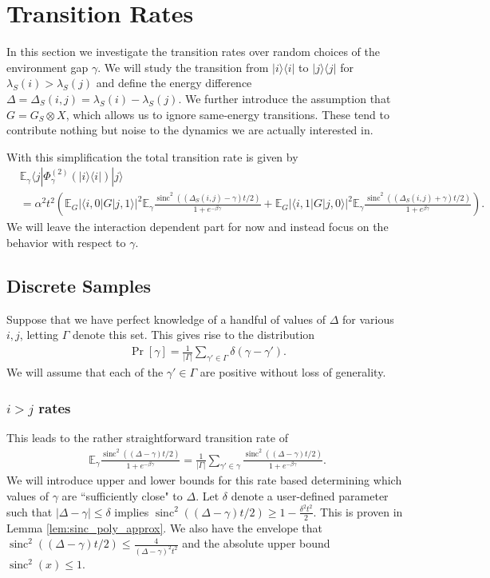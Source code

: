 \documentclass[
 amsmath,amssymb,
 aps,
onecolumn, 
nofootinbib]{revtex4-2}
\newcommand{\ket}[1]{|#1\rangle}
\newcommand{\bra}[1]{\langle #1|}
\newcommand{\ketbra}[2]{| #1\rangle\! \langle #2|}
\newcommand{\abs}[1]{\left| #1 \right|}
\newcommand{\EE}{\mathbb{E}}
\newcommand{\tp}{\otimes}
\DeclareMathOperator{\sinc}{sinc}
\begin{document}
\section{Transition Rates}
In this section we investigate the transition rates over random choices of the environment gap $\gamma$. We will study the transition from $\ketbra{i}{i}$ to $\ketbra{j}{j}$ for $\lambda_S(i) > \lambda_S(j)$ and define the energy difference $\Delta = \Delta_S(i,j) = \lambda_S(i) - \lambda_S (j)$. We further introduce the assumption that $G = G_S \tp X$, which allows us to ignore same-energy transitions. These tend to contribute nothing but noise to the dynamics we are actually interested in. 

With this simplification the total transition rate is given by
\begin{align}
    &\EE_\gamma \bra{j} \Phi^{(2)}_\gamma(\ketbra{i}{i}) \ket{j} \nonumber \\
    &= \alpha^2 t^2 \left(\EE_G \abs{\bra{i, 0} G \ket{j, 1}}^2 \EE_\gamma \frac{\sinc^2 ((\Delta_S(i,j) - \gamma) t/ 2)}{1 + e^{-\beta \gamma}} + \EE_G \abs{\bra{i,1} G \ket{j, 0}}^2 \EE_\gamma \frac{\sinc^2((\Delta_S(i,j) + \gamma) t/ 2)}{1 + e^{\beta \gamma}}\right). 
\end{align}
We will leave the interaction dependent part for now and instead focus on the behavior with respect to $\gamma$. 

\subsection{Discrete Samples}
Suppose that we have perfect knowledge of a handful of values of $\Delta$ for various $i, j$, letting $\Gamma$ denote this set. This gives rise to the distribution
\begin{align}
    \Pr[\gamma] = \frac{1}{\abs{\Gamma}}\sum_{\gamma' \in \Gamma} \delta(\gamma - \gamma').
\end{align}
We will assume that each of the $\gamma' \in \Gamma$ are positive without loss of generality.

\subsubsection{$i > j$ rates}
This leads to the rather straightforward transition rate of
\begin{align}
    \EE_\gamma \frac{\sinc^2((\Delta - \gamma) t/ 2)}{1 + e^{-\beta \gamma}} = \frac{1}{|\Gamma|}\sum_{\gamma' \in \gamma} \frac{\sinc^2((\Delta - \gamma) t/ 2)}{1 + e^{-\beta \gamma}}.
\end{align}
We will introduce upper and lower bounds for this rate based determining which values of $\gamma$ are ``sufficiently close" to $\Delta$. Let $\delta$ denote a user-defined parameter such that $\abs{\Delta - \gamma} \le \delta$ implies $\sinc^2((\Delta - \gamma)t /2) \ge 1 - \frac{\delta^2 t^2}{2}$. This is proven in Lemma \ref{lem:sinc_poly_approx}. We also have the envelope that $\sinc^2 ((\Delta - \gamma)t /2) \le \frac{4}{(\Delta - \gamma)^2 t^2}$ and the absolute upper bound $\sinc^2(x) \le 1$. 
\end{document}
